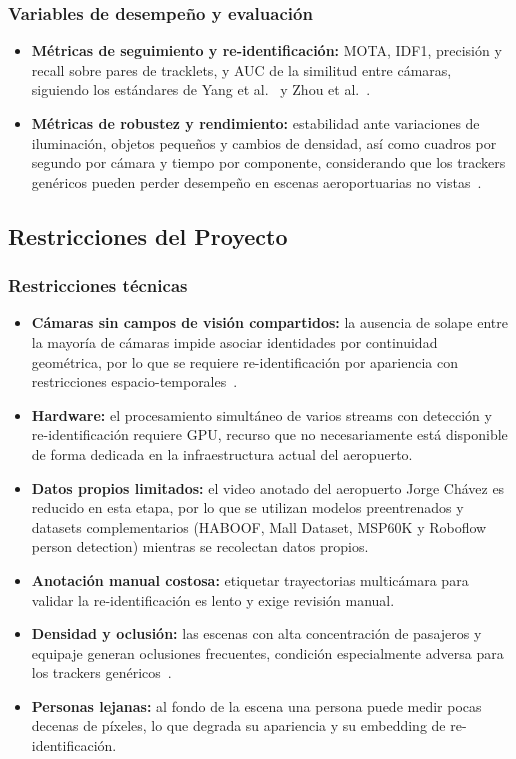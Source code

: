 \documentclass[12pt,letterpaper]{article}
\begin{document}
\subsubsection{Variables de desempeño y evaluación}
\begin{itemize}
    \item \textbf{Métricas de seguimiento y re-identificación:} MOTA,
    IDF1, precisión y recall sobre pares de tracklets, y AUC de la
    similitud entre cámaras, siguiendo los estándares de Yang et
    al.~\cite{yang2023} y Zhou et al.~\cite{zhou2026}.
    \item \textbf{Métricas de robustez y rendimiento:} estabilidad ante
    variaciones de iluminación, objetos pequeños y cambios de densidad,
    así como cuadros por segundo por cámara y tiempo por componente,
    considerando que los trackers genéricos pueden perder desempeño en
    escenas aeroportuarias no vistas~\cite{zhou2026}.
\end{itemize}

\subsection{Restricciones del Proyecto}

\subsubsection{Restricciones técnicas}
\begin{itemize}
    \item \textbf{Cámaras sin campos de visión compartidos:} la ausencia
    de solape entre la mayoría de cámaras impide asociar identidades por
    continuidad geométrica, por lo que se requiere re-identificación por
    apariencia con restricciones espacio-temporales~\cite{yang2023}.
    \item \textbf{Hardware:} el procesamiento simultáneo de varios
    streams con detección y re-identificación requiere GPU, recurso que
    no necesariamente está disponible de forma dedicada en la
    infraestructura actual del aeropuerto.
    \item \textbf{Datos propios limitados:} el video anotado del
    aeropuerto Jorge Chávez es reducido en esta etapa, por lo que se
    utilizan modelos preentrenados y datasets complementarios (HABOOF,
    Mall Dataset, MSP60K y Roboflow person detection) mientras se
    recolectan datos propios.
    \item \textbf{Anotación manual costosa:} etiquetar trayectorias
    multicámara para validar la re-identificación es lento y exige
    revisión manual.
    \item \textbf{Densidad y oclusión:} las escenas con alta concentración
    de pasajeros y equipaje generan oclusiones frecuentes, condición
    especialmente adversa para los trackers genéricos~\cite{zhou2026}.
    \item \textbf{Personas lejanas:} al fondo de la escena una persona
    puede medir pocas decenas de píxeles, lo que degrada su apariencia y
    su embedding de re-identificación.
\end{itemize}
\end{document}
